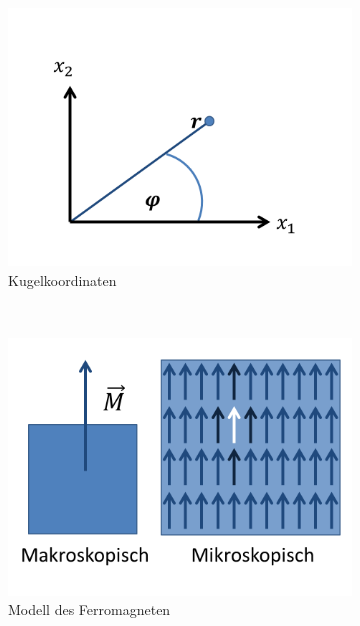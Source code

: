 \documentclass[12pt]{article}
\begin{document}
\begin{itemize}
\begin{figure}[h] 
		\begin{subfigure}[h]{0.5 \textwidth}
		\centering
		\includegraphics[width=\textwidth]{Folie25.png}
		\caption{Kugelkoordinaten} 
		\label{fig:Kugelkoordinaten}
		\centering
	\end{subfigure}
	~
\begin{subfigure}[h]{0.5\textwidth}
		\centering
		\includegraphics[width=\textwidth]{Folie26.png}
		\caption{Modell des Ferromagneten}
		\label{fig:Ferromagnet}
		\centering
	\end{subfigure}
	\caption{ }
\end{figure}	



\end{itemize}
\end{document}
